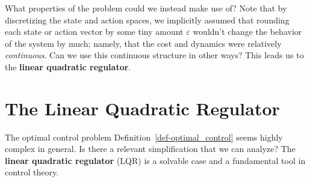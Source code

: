 \documentclass[
  letterpaper,
  DIV=11,
  numbers=noendperiod]{scrreprt}
\theoremstyle{plain}
\theoremstyle{plain}
\theoremstyle{definition}
\theoremstyle{definition}
\theoremstyle{remark}
\begin{document}
What properties of the problem could we instead make use of? Note that
by discretizing the state and action spaces, we implicitly assumed that
rounding each state or action vector by some tiny amount \(\varepsilon\)
wouldn't change the behavior of the system by much; namely, that the
cost and dynamics were relatively \emph{continuous}. Can we use this
continuous structure in other ways? This leads us to the \textbf{linear
quadratic regulator}.

\section{The Linear Quadratic Regulator}\label{sec-lqr}

The optimal control problem Definition~\ref{def-optimal_control} seems
highly complex in general. Is there a relevant simplification that we
can analyze? The \textbf{linear quadratic regulator} (LQR) is a solvable
case and a fundamental tool in control theory.
\end{document}
